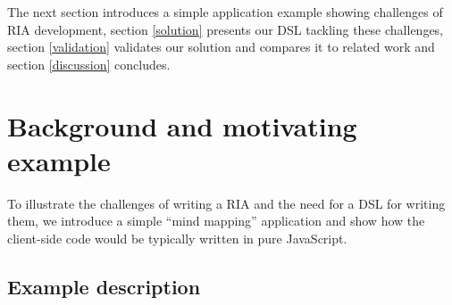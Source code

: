 \documentclass[american,english,runningheads]{llncs}
\begin{document}
% 
% 
% 
% 
% 
% 

The next section introduces a simple application example showing challenges of RIA development, section
\ref{solution} presents our DSL tackling these challenges, section \ref{validation} validates our solution and
compares it to related work and section \ref{discussion} concludes.


\section{Background and motivating example}
\label{problem}

To illustrate the challenges of writing a RIA and the need for a DSL for writing them, we introduce a simple “mind
mapping” application and show how the client-side code would be typically written in pure JavaScript.

\subsection{Example description}
\end{document}

